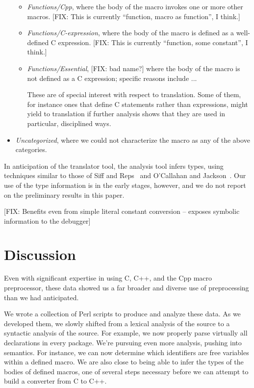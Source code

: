 \begin{itemize}
\begin{itemize}
\item {\em Functions/Cpp\/}, where the body of the macro invokes one
or more other macros.  [FIX: This is currently ``function, macro as
function'', I think.]

\item {\em Functions/C-expression\/}, where the body of the macro is
defined as a well-defined C expression.  [FIX: This is currently
``function, some constant'', I think.]

\item {\em Functions/Essential\/}, [FIX: bad name?] where the body of the
macro is not defined as a C expression; specific reasons include
...

These are of special interest with respect to translation.  Some of
them, for instance ones that define C statements rather than
expressions, might yield to translation if further analysis shows that
they are used in particular, disciplined ways.

\end{itemize}

\item {\em Uncategorized\/}, where we could not characterize the macro
as any of the above categories.

\end{itemize}

In anticipation of the translator tool, the analysis tool infers
types, using techniques similar to those of Siff and Reps~\cite{Siff-fse96}
and O'Callahan and Jackson~\cite{OCallahan-icse97}.  Our use of the
type information is in the early stages, however, and we do not report
on the preliminary results in this paper.

[FIX: Benefits even from simple literal constant conversion -- exposes
symbolic information to the debugger]


\section{Discussion}\label{sec:discussion}

Even with significant expertise in using C, C++, and the Cpp macro
preprocessor, these data showed us a far broader and diverse use of
preprocessing than we had anticipated.  

We wrote a collection of Perl scripts to produce and analyze these
data.  As we developed them, we slowly shifted from a lexical analysis
of the source to a syntactic analysis of the source.  For example, we
now properly parse virtually all declarations in every package.  We're
pursuing even more analysis, pushing into semantics.  For instance, we
can now determine which identifiers are free variables within a defined
macro.  We are also close to being able to infer the types of the bodies
of defined macros, one of several steps necessary before we can attempt
to build a converter from C to C++.

